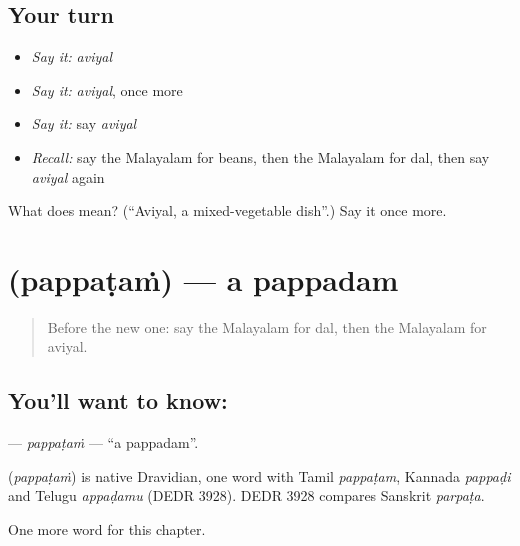\subsection*{Your turn}
\begin{itemize}
\raggedright
  \item \emph{Say it:} \emph{aviyal}
  \item \emph{Say it:} \emph{aviyal}, once more
  \item \emph{Say it:} say \emph{aviyal}
  \item \emph{Recall:} say the Malayalam for beans, then the Malayalam for dal, then say \emph{aviyal} again
\end{itemize}

\begin{tcolorbox}[breakable,colback=teal!4,colframe=teal!35!black,title={Before you move on}]
What does  mean? (\textquotedblleft{}Aviyal, a mixed-vegetable dish\textquotedblright{}.) Say it once more.
\end{tcolorbox}
\section[\texorpdfstring{\ml{പപ്പടം} (pappaṭaṁ)}{പപ്പടം (pappaṭaṁ)}]{ (pappaṭaṁ) — a pappadam}

\label{lesson:ML-C164-pappatam}



\begin{quote}
Before the new one: say the Malayalam for dal, then the Malayalam for aviyal.
\end{quote}

\subsection*{You'll want to know: }
\textbf{} — \emph{pappaṭaṁ} — \textquotedblleft{}a pappadam\textquotedblright{}.

\begin{cousinweb}
\textbf{} (\emph{pappaṭaṁ}) is native Dravidian, one word with Tamil \emph{pappaṭam}, Kannada \emph{pappaḍi} and Telugu \emph{appaḍamu} (DEDR 3928). DEDR 3928 compares Sanskrit \emph{parpaṭa}.
\end{cousinweb}

\begin{grammarlens}[title={What you've built}]
One more word for this chapter.
\end{grammarlens}


